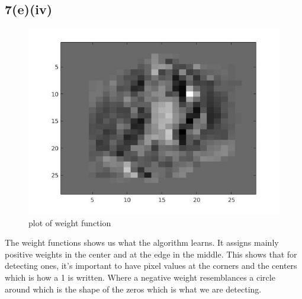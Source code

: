 \documentclass{article}
\begin{document}
\subsection*{7(e)(iv)}
\begin{figure}[H]
\centering
\includegraphics[width=6.5in]{figures/q7-6.jpg}
\caption{plot of weight function}
\end{figure}
The weight functions shows us what the algorithm learns. It assigns mainly positive weights in the center and at the edge in the middle. This shows that for detecting ones, it's important to have pixel values at the corners and the centers which is how a 1 is written. Where a negative weight resemblances a circle around which is the shape of the zeros which is what we are detecting. 
\end{document}
